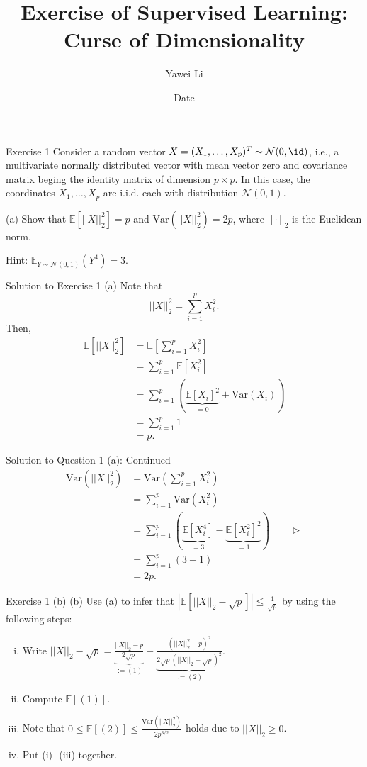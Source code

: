 \documentclass[aspectratio=169]{beamer}
\title[]{\textbf{Exercise of Supervised Learning: 
\\ Curse of Dimensionality}}
\author{Yawei Li}
\institute[LMU]
{
\\
  \texttt{yawei.li@stat.uni-muenchen.de}
}
\date{Date}
\renewcommand{\E}{\mathbb{E}}
\newcommand{\Xnorm}{||X||_2}
\newcommand{\Xnormsq}{||X||_2^2}
\newcommand{\Var}[1]{\mathrm{Var}(#1)}
\newcommand{\sumip}{\sum_{i=1}^p}
\begin{document}
\begin{frame}
\titlepage

\end{frame}

\begin{frame}{Exercise 1}
	Consider a random vector $X = (X_1, \ldots, X_p)^T \sim \mathcal{N}(0, \id)$, i.e., a multivariate normally distributed vector with mean vector zero and covariance matrix beging the identity matrix of dimension $p \times p$. In this case, the coordinates $X_1, \ldots, X_p$ are i.i.d. each with distribution $\mathcal{N}(0, 1)$.
	
	(a) Show that $\E[\Xnormsq] = p$ and $\Var{\Xnormsq} = 2p$, where $|| \cdot ||_2$ is the Euclidean norm. 
	
	Hint: $\E_{Y \sim \mathcal{N}(0, 1)}(Y^4) = 3.$
\end{frame}

\begin{frame}{Solution to Exercise 1 (a)}
	\small
	Note that $$\Xnormsq = \sum_{i=1}^p X_i^2.$$
	Then, 
	\begin{align*}
		\E[\Xnormsq] &= \E \left[ \sumip X_i^2 \right] \\
		&= \sumip \E[X_i^2] \\
		&= \sumip (\underbrace{\E[X_i]^2}_{=0} + \Var{X_i}) \\
		&= \sumip 1 \\
		&= p.
	\end{align*}
\end{frame}

\begin{frame}{Solution to Question 1 (a): Continued}
	\small
	\begin{align*}
		\Var{\Xnormsq} &= \Var{\sumip X_i^2} \\
		&= \sumip \Var{X_i^2} \\
		&= \sumip (\underbrace{\E[X_i^4]}_{=3} - \underbrace{\E[X_i^2]^2}_{=1}) \qquad \rhd \\
		&= \sumip (3 - 1) \\
		&= 2p.
	\end{align*}
\end{frame}

\begin{frame}{Exercise 1 (b)}
	(b) Use (a) to infer that $|\E[\Xnorm - \sqrt{p}]| \leq \frac{1}{\sqrt{p}}$ by using the following steps:
	\begin{enumerate}[(i)]
		\item Write $\Xnorm - \sqrt{p} = \underbrace{\frac{\Xnorm - p}{2\sqrt{p}}}_{:= (1)} - \underbrace{\frac{(\Xnormsq - p)^2}{2\sqrt{p}(||X||_2 + \sqrt{p})^2}}_{:= (2)}.$ 
		\item Compute $\E[(1)]$.
		\item Note that $0 \leq \E[(2)] \leq \frac{\Var{\Xnormsq}}{2 p^{3/2}}$ holds due to $||X||_2 \geq 0$.
		\item Put (i)- (iii) together.
	\end{enumerate}
\end{frame}
\end{document}
